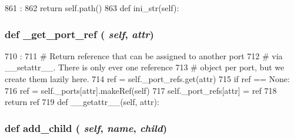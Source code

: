 \begin{DoxyCode}
861                      :
862         return self.path()
863 
    def ini_str(self):
\end{DoxyCode}
\hypertarget{classm5_1_1SimObject_1_1SimObject_aa6e711a94a8562cfd1099d3d89b9f960}{
\subsubsection[{\_\-get\_\-port\_\-ref}]{\setlength{\rightskip}{0pt plus 5cm}def \_\-get\_\-port\_\-ref ( {\em self}, \/   {\em attr})}}
\label{classm5_1_1SimObject_1_1SimObject_aa6e711a94a8562cfd1099d3d89b9f960}



\begin{DoxyCode}
710                                  :
711         # Return reference that can be assigned to another port
712         # via __setattr__.  There is only ever one reference
713         # object per port, but we create them lazily here.
714         ref = self._port_refs.get(attr)
715         if ref == None:
716             ref = self._ports[attr].makeRef(self)
717             self._port_refs[attr] = ref
718         return ref
719 
    def __getattr__(self, attr):
\end{DoxyCode}
\hypertarget{classm5_1_1SimObject_1_1SimObject_a48c30f83f1eccba721c925bf31eb4d76}{
\subsubsection[{add\_\-child}]{\setlength{\rightskip}{0pt plus 5cm}def add\_\-child ( {\em self}, \/   {\em name}, \/   {\em child})}}
\label{classm5_1_1SimObject_1_1SimObject_a48c30f83f1eccba721c925bf31eb4d76}



